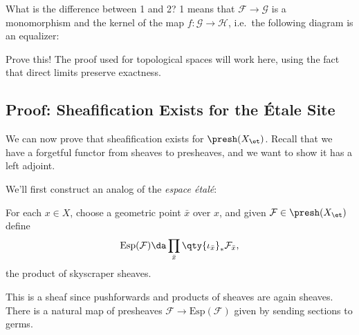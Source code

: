 \begin{remark}

What is the difference between 1 and 2? 1 means that
\(\mathcal{F}\to \mathcal{G}\) is a monomorphism and the kernel of the
map \(f: \mathcal{G}\to \mathcal{H}\), i.e.~the following diagram is an
equalizer:

\begin{center}
\end{center}

\end{remark}

\begin{exercise}[?]

Prove this! The proof used for topological spaces will work here, using
the fact that direct limits preserve exactness.

\end{exercise}

\hypertarget{proof-sheafification-exists-for-the-uxe9tale-site}{%
\subsection{Proof: Sheafification Exists for the Étale
Site}\label{proof-sheafification-exists-for-the-uxe9tale-site}}

We can now prove that sheafification exists for \(\presh(X_{\et})\).
Recall that we have a forgetful functor from sheaves to presheaves, and
we want to show it has a left adjoint.

We'll first construct an analog of the \emph{espace étalé}:

\begin{definition}

For each \(x\in X\), choose a geometric point \(\bar x\) over \(x\), and
given \(\mathcal{F}\in \presh(X_{\et})\) define
\begin{align*}  
\mathrm{Esp}(\mathcal{F}) \da \prod_{\bar x} \qty{\iota_{\bar x}}_* \mathcal{F}_{\bar x}
,\end{align*} the product of skyscraper sheaves.

\end{definition}

\begin{remark}

This is a sheaf since pushforwards and products of sheaves are again
sheaves. There is a natural map of presheaves
\(\mathcal{F}\to \mathrm{Esp}(\mathcal{F})\) given by sending sections
to germs.

\end{remark}

